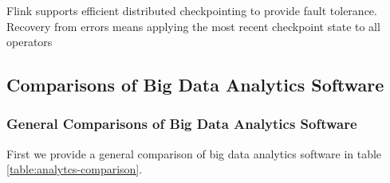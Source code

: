 \documentclass[]{article}
\begin{document}
Flink supports efficient distributed checkpointing to provide fault tolerance. Recovery from errors means applying the most recent checkpoint state to all operators






\subsection{Comparisons of Big Data Analytics Software}
\subsubsection{General Comparisons of Big Data Analytics Software}
First we provide a general comparison of big data analytics software in table \ref{table:analytcs-comparison}.
\end{document}
